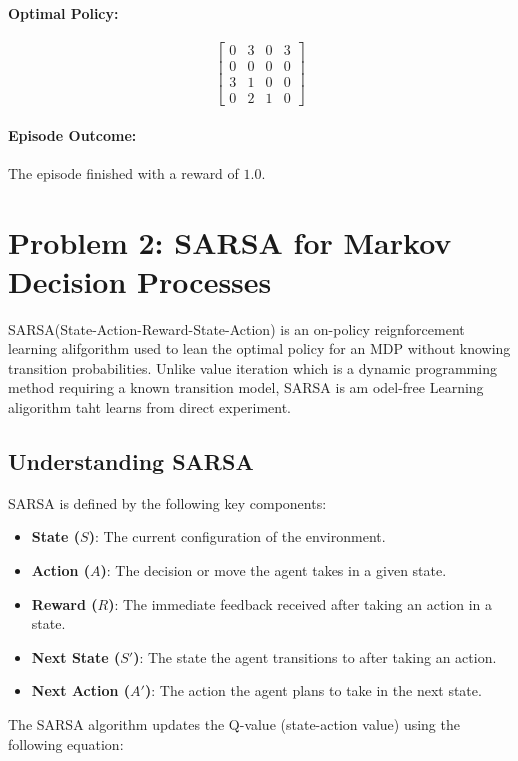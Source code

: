 \documentclass{article}
\begin{document}
\paragraph{Optimal Policy:}
\[
\begin{bmatrix}
0 & 3 & 0 & 3 \\
0 & 0 & 0 & 0 \\
3 & 1 & 0 & 0 \\
0 & 2 & 1 & 0
\end{bmatrix}
\]

\paragraph{Episode Outcome:}
The episode finished with a reward of \(1.0\).
\clearpage

\section*{Problem 2: SARSA for Markov Decision Processes}

SARSA(State-Action-Reward-State-Action) is an on-policy reignforcement learning alifgorithm used to lean the optimal policy for an MDP without
knowing transition probabilities. Unlike value iteration which is a dynamic programming method requiring a known transition model, SARSA is am odel-free Learning aligorithm taht learns from direct experiment.

\subsection*{Understanding SARSA}
SARSA is defined by the following key components:

\begin{itemize}
    \item \textbf{State (\(S\))}: The current configuration of the environment.
    \item \textbf{Action (\(A\))}: The decision or move the agent takes in a given state.
    \item \textbf{Reward (\(R\))}: The immediate feedback received after taking an action in a state.
    \item \textbf{Next State (\(S'\))}: The state the agent transitions to after taking an action.
    \item \textbf{Next Action (\(A'\))}: The action the agent plans to take in the next state.
\end{itemize}

The SARSA algorithm updates the Q-value (state-action value) using the following equation:
\end{document}

